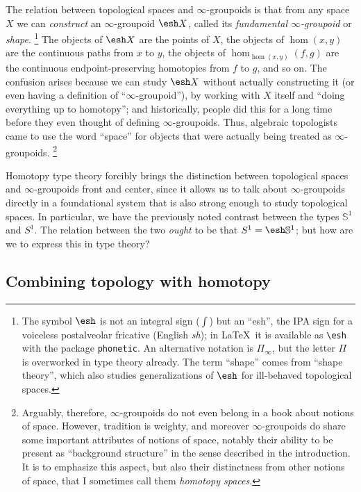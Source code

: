 \documentclass[12pt]{article}
\def\oo{\ensuremath{\infty}}
\def\hocirc{S^1}
\def\topcirc{\mathbb{S}^1}
\numberwithin{equation}{section}
\newcommand{\shape}{\ensuremath{\mathord{\raisebox{0.5pt}{\text{\rm\esh}}}}}
\begin{document}
The relation between topological spaces and \oo-groupoids is that from any space $X$ we can \emph{construct} an \oo-groupoid $\shape X$, called its \emph{fundamental \oo-groupoid} or \emph{shape}.%
\footnote{The symbol $\shape$ is not an integral sign ($\int$) but an ``esh'', the IPA sign for a voiceless postalveolar fricative (English \textit{sh}); in \LaTeX\ it is available as \verb|\esh| with the package \texttt{phonetic}.
  An alternative notation is $\Pi_\oo$, but the letter $\Pi$ is overworked in type theory already.
  The term ``shape'' comes from ``shape theory'', which also studies generalizations of $\shape$ for ill-behaved topological spaces.}
The objects of $\shape X$ are the points of $X$, the objects of $\hom(x,y)$ are the continuous paths from $x$ to $y$, the objects of $\hom_{\hom(x,y)}(f,g)$ are the continuous endpoint-preserving homotopies from $f$ to $g$, and so on.
The confusion arises because we can study $\shape X$ without actually constructing it (or even having a definition of ``\oo-groupoid''), by working with $X$ itself and ``doing everything up to homotopy''; and historically, people did this for a long time before they even thought of defining \oo-groupoids.
Thus, algebraic topologists came to use the word ``space'' for objects that were actually being treated as \oo-groupoids.%
\footnote{Arguably, therefore, \oo-groupoids do not even belong in a book about notions of space.
However, tradition is weighty, and moreover \oo-groupoids do share some important attributes of notions of space, notably their ability to be present as ``background structure'' in the sense described in the introduction.
It is to emphasize this aspect, but also their distinctness from other notions of space, that I sometimes call them \emph{homotopy spaces}.}

Homotopy type theory forcibly brings the distinction between topological spaces and \oo-groupoids front and center, since it allows us to talk about \oo-groupoids directly in a foundational system that is also strong enough to study topological spaces.
In particular, we have the previously noted contrast between the types $\topcirc$ and $\hocirc$.
The relation between the two \emph{ought} to be that $\hocirc = \shape \topcirc$; but how are we to express this in type theory?

\subsection{Combining topology with homotopy}
\label{sec:comb-topol-with}
\end{document}
